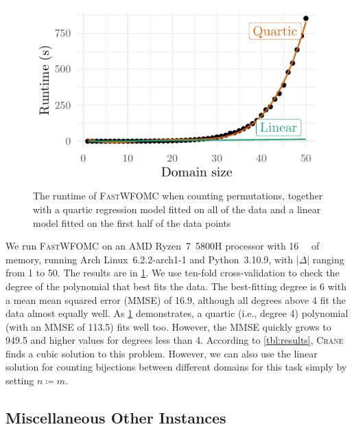 \documentclass{article}
\begin{document}
\begin{figure}[t]
  \includegraphics{plot}
  \caption{The runtime of \textsc{FastWFOMC} when counting permutations,
    together with a quartic regression model fitted on all of the data and a
    linear model fitted on the first half of the data
    points}\label{fig:fastwfomc}
\end{figure}

We run \textsc{FastWFOMC} on an AMD Ryzen~7~5800H processor with
\SI{16}{\giga\byte} of memory, running Arch Linux~6.2.2-arch1-1 and
Python~3.10.9, with $|\Delta|$ ranging from 1 to 50. The results are in
\cref{fig:fastwfomc}. We use ten-fold cross-validation to check the degree of
the polynomial that best fits the data. The best-fitting degree is 6 with a mean
mean squared error (MMSE) of 16.9, although all degrees above 4 fit the data
almost equally well. As \cref{fig:fastwfomc} demonstrates, a quartic (i.e.,
degree 4) polynomial (with an MMSE of 113.5) fits well too. However, the MMSE
quickly grows to 949.5 and higher values for degrees less than 4. According to
\cref{tbl:results}, \textsc{Crane} finds a cubic solution to this problem.
However, we can also use the linear solution for counting bijections between
different domains for this task simply by setting $n \coloneqq m$.

\subsection{Miscellaneous Other Instances}
\end{document}
